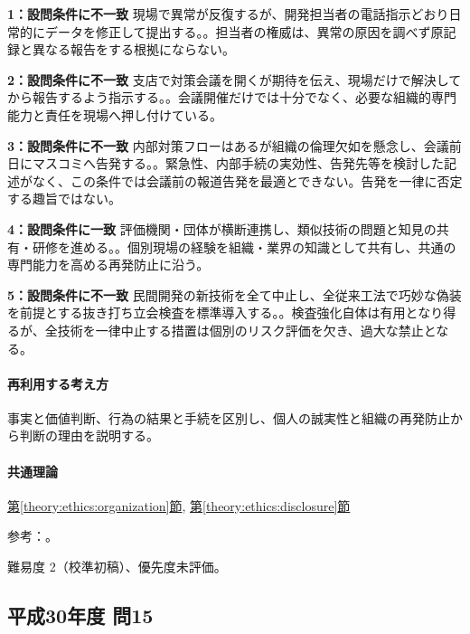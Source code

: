 \noindent\textbf{1：設問条件に不一致} 現場で異常が反復するが、開発担当者の電話指示どおり日常的にデータを修正して提出する。。担当者の権威は、異常の原因を調べず原記録と異なる報告をする根拠にならない。\par

\noindent\textbf{2：設問条件に不一致} 支店で対策会議を開くが期待を伝え、現場だけで解決してから報告するよう指示する。。会議開催だけでは十分でなく、必要な組織的専門能力と責任を現場へ押し付けている。\par

\noindent\textbf{3：設問条件に不一致} 内部対策フローはあるが組織の倫理欠如を懸念し、会議前日にマスコミへ告発する。。緊急性、内部手続の実効性、告発先等を検討した記述がなく、この条件では会議前の報道告発を最適とできない。告発を一律に否定する趣旨ではない。\par

\noindent\textbf{4：設問条件に一致} 評価機関・団体が横断連携し、類似技術の問題と知見の共有・研修を進める。。個別現場の経験を組織・業界の知識として共有し、共通の専門能力を高める再発防止に沿う。\par

\noindent\textbf{5：設問条件に不一致} 民間開発の新技術を全て中止し、全従来工法で巧妙な偽装を前提とする抜き打ち立会検査を標準導入する。。検査強化自体は有用となり得るが、全技術を一律中止する措置は個別のリスク評価を欠き、過大な禁止となる。\par

\paragraph{再利用する考え方} 事実と価値判断、行為の結果と手続を区別し、個人の誠実性と組織の再発防止から判断の理由を説明する。

\paragraph{共通理論} \hyperref[theory:ethics:organization]{第\ref*{theory:ethics:organization}節}, \hyperref[theory:ethics:disclosure]{第\ref*{theory:ethics:disclosure}節}

\par 参考：\cite{ipej_ethics2023,scj_code2013}。

\par 難易度 2（校準初稿）、優先度未評価。

\subsection{平成30年度 問15}
\label{q:h30-reg-apt-15}

